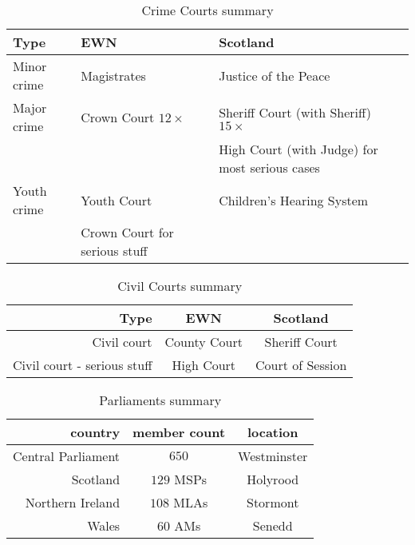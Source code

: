 \documentclass{amsart}
\begin{document}
\begin{table}[h!]
	 \begin{center}
		\begin{tabular}{|l||l|l|}
			\hline
			 		Type 	&  EWN  & Scotland  \\
			\hline
			\hline
			Minor crime & Magistrates & Justice of the Peace \\
			\hline
			Major crime & Crown Court  $12\times $ & Sheriff Court (with Sheriff) $15\times$ \\
			 && High Court (with Judge) for most serious cases \\
			\hline
			Youth crime & Youth Court & Children's Hearing System\\
			&  Crown Court for serious stuff &\\
			\hline
		\end{tabular}
		\caption{Crime Courts summary}\label{tab:crimecourts}
  	\end{center}
\end{table}

\begin{table}[h!]
	 \begin{center}
		\begin{tabular}{|r||c|c|}
			\hline
			 		Type 	&  EWN  & Scotland  \\
			\hline
			\hline
			Civil court  & County Court  & Sheriff Court \\
			\hline
			Civil court - serious stuff &High Court & Court of Session\\
			\hline	
		\end{tabular}
		\caption{Civil Courts summary}\label{tab:civilcourts}
  	\end{center}
\end{table}

\begin{table}[h!]
	 \begin{center}
		\begin{tabular}{|r|c|c|}
			\hline
			 country			&  member count  & location  \\
			\hline
			\hline
			Central Parliament & $650$ & Westminster \\
			\hline
			Scotland & $129$ MSPs & Holyrood\\
			\hline
			Northern Ireland & $108$ MLAs & Stormont\\
			\hline
			Wales & $60$ AMs & Senedd \\
			\hline	
		\end{tabular}
		\caption{Parliaments summary}\label{tab:parliaments}
  	\end{center}
\end{table}
\end{document}
